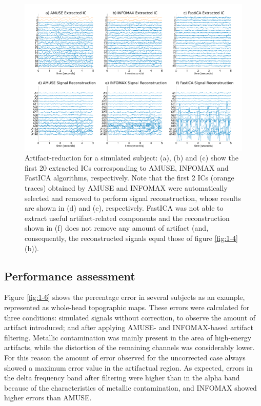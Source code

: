 \begin{figure}[ht!]
\centering
\hspace*{-0.7cm}
\includegraphics[width=1.1\textwidth]{Images/fig1-5.png}
\caption{ Artifact-reduction for a simulated subject: (a), (b) and (c) show the first 20 extracted ICs corresponding to AMUSE, INFOMAX and FastICA algorithms, respectively. Note that the first 2 ICs (orange traces) obtained by AMUSE and INFOMAX were automatically selected and removed to perform signal reconstruction, whose results are shown in (d) and (e), respectively. FastICA was not able to extract useful artifact-related components and the reconstruction shown in (f) does not remove any amount of artifact (and, consequently, the reconstructed signals equal those of figure \ref{fig:1-4}(b)).}
\label{fig:1-5}
\end{figure}   

\subsection{Performance assessment}

Figure \ref{fig:1-6} shows the percentage error in several subjects as an example, represented as whole-head topographic maps. These errors were calculated for three conditions: simulated signals without correction, to observe the amount of artifact introduced; and after applying AMUSE- and INFOMAX-based artifact filtering. Metallic contamination was mainly present in the area of high-energy artifacts, while the distortion of the remaining channels was considerably lower. For this reason the amount of error observed for the uncorrected case always showed a maximum error value in the artifactual region. As expected, errors in the delta frequency band after filtering were higher than in the alpha band because of the characteristics of metallic contamination, and INFOMAX showed higher errors than AMUSE.


